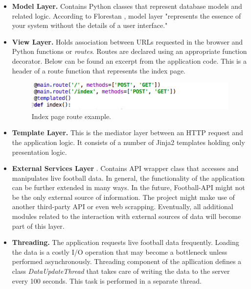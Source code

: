 \begin{itemize}
    \item \textbf{Model Layer.} Contains Python classes that represent database models and related logic. According to Florestan \cite{article:goodArchitecture}, model layer "represents the essence of your system without the details of a user interface."
    \item \textbf{View Layer.} Holds association between URLs requested in the browser and Python functions or \emph{routes}. Routes are declared using an appropriate function decorator. Below can be found an excerpt from the application code. This is a header of a route function that represents the index page.

\begin{figure}[H]
    \begin{center}
        \includegraphics[width=.50\linewidth,natwidth=610,natheight=642]{impl/images/indexPageRoute}
        \caption{Index page route example.} \label{fig:using:indexPageRoute}
    \end{center}
\end{figure}     
        
    \item \textbf{Template Layer.} This is the mediator layer between an HTTP request and the application logic. It consists of a number of Jinja2 templates holding only     presentation logic. 
    \item \textbf{External Services Layer} \cite{article:goodArchitecture}. Contains API wrapper class that accesses and manipulates live football data. In general, the functionality of the application can be further extended in many ways. In the future, Football-API might not be the only external source of information. The project might make use of another third-party API or even web scrapping. Eventually, all additional modules related to the interaction with external sources of data will become part of this layer.
    \item \textbf{Threading.} The application requests live football data frequently. Loading the data is a costly I/O operation that may become a bottleneck unless performed asynchronously. Threading component of the apllication defines a class \emph{DataUpdateThread} that takes care of writing the data to the server every 100 seconds. This task is performed in a separate thread. 
\end{itemize}

